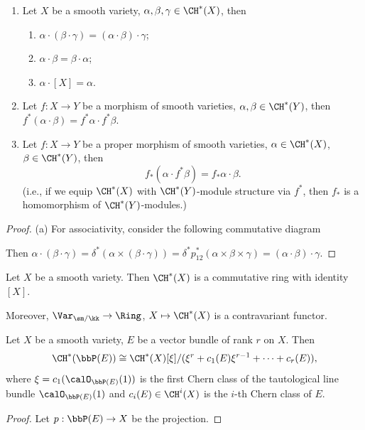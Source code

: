   \begin{theorem}
    \begin{enumerate}
      \item Let $X$ be a smooth variety, $\alpha, \beta, \gamma \in \CH^*(X)$, then 
        \begin{enumerate}
          \item $\alpha \cdot (\beta \cdot \gamma) = (\alpha \cdot \beta) \cdot \gamma$;
          \item $\alpha \cdot \beta = \beta \cdot \alpha$;
          \item $\alpha \cdot [X] = \alpha$.
        \end{enumerate}
      \item Let $f:X \to Y$ be a morphism of smooth varieties, $\alpha, \beta \in \CH^*(Y)$, then $f^*(\alpha \cdot \beta) = f^* \alpha \cdot f^* \beta$.
      \item Let $f:X \to Y$ be a proper morphism of smooth varieties, $\alpha \in \CH^*(X)$, $\beta \in \CH^*(Y)$, then 
        \[ f_* (\alpha \cdot f^* \beta) = f_* \alpha \cdot \beta. \]
        (i.e., if we equip $\CH^*(X)$ with $\CH^*(Y)$-module structure via $f^*$, then $f_*$ is a homomorphism of $\CH^*(Y)$-modules.)
    \end{enumerate}
  \end{theorem}
  \begin{proof}
    (a) For associativity, consider the following commutative diagram
    
    Then $\alpha \cdot (\beta \cdot \gamma) = \delta^* (\alpha \times (\beta \cdot \gamma)) = \delta^* p_{12}^* (\alpha \times \beta \times \gamma) = (\alpha \cdot \beta) \cdot \gamma$.
    \Yang{}

    \Yang{}
  \end{proof}

  \begin{corollary}
    Let $X$ be a smooth variety.
    Then $\CH^*(X)$ is a commutative ring with identity $[X]$.
     
    Moreover, $\Var_{\sm/\kk} \to \Ring$, $X \mapsto \CH^*(X)$ is a contravariant functor.
  \end{corollary}


  \begin{theorem}
    Let $X$ be a smooth variety, $E$ be a vector bundle of rank $r$ on $X$.
    Then 
    \[ \CH^*(\bbP(E)) \cong \CH^*(X)[\xi]/(\xi^r + c_1(E) \xi^{r-1} + \cdots + c_r(E)), \]
    where $\xi = c_1(\calO_{\bbP(E)}(1))$ is the first Chern class of the tautological line bundle $\calO_{\bbP(E)}(1)$ and $c_i(E) \in \CH^i(X)$ is the $i$-th Chern class of $E$.
  \end{theorem}
  \begin{proof}
    Let $p: \bbP(E) \to X$ be the projection.

    \Yang{}
  \end{proof}

